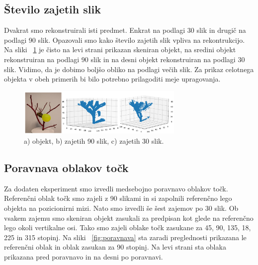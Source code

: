 \documentclass[journal,a4paper,twoside]{sty/IEEEtran}
\begin{document}
\subsection{Število zajetih slik}
Dvakrat smo rekonstruirali isti predmet. Enkrat na podlagi 30 slik in drugič na podlagi 90 slik. Opazovali smo kako število zajetih slik vpliva na rekontrukcijo. Na sliki ~\ref{fig:slika_90_30} je čisto na levi strani prikazan skeniran objekt, na sredini objekt rekonstruiran na podlagi 90 slik in na desni objekt rekonstruiran na podlagi 30 slik. Vidimo, da je dobimo boljšo obliko na podlagi večih slik. Za prikaz celotnega objekta v obeh primerih bi bilo potrebno prilagoditi meje upragovanja. 
%
\begin{figure}[H]
	\centerline{\includegraphics[width=8cm]{fig/slika_90_30}}
	\caption{a) objekt, b) zajetih 90 slik, c) zajetih 30 slik.}
	\label{fig:slika_90_30}
\end{figure}
%
%
\subsection{Poravnava oblakov točk}
Za dodaten eksperiment smo izvedli medsebojno poravnavo oblakov točk. Referenčni oblak točk smo zajeli z 90 slikami in si zapolnili referenčno lego objekta na pozicionirni mizi. Nato smo izvedli še šest zajemov po 30 slik. Ob vsakem zajemu smo skeniran objekt zasukali za predpisan kot glede na referenčno lego okoli vertikalne osi. Tako smo zajeli oblake točk zasukane za 45, 90, 135, 18, 225 in 315 stopinj. Na sliki ~\ref{fig:poravnava} sta zaradi preglednosti prikazana le referenčni oblak in oblak zasukan za 90 stopinj. Na levi strani sta oblaka prikazana pred poravnavo in na desni po poravnavi. 
\end{document}
